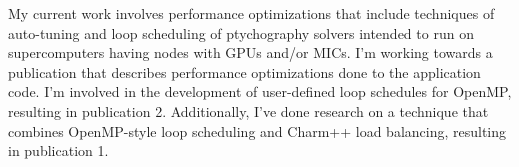 
My current work involves performance optimizations that include
techniques of auto-tuning and loop scheduling of ptychography solvers
intended to run on supercomputers having nodes with GPUs and/or MICs. 
I'm working towards a publication that describes performance
optimizations done to the application code.
I'm involved in the development of user-defined loop schedules
for OpenMP, resulting in publication 2. Additionally, I've done
research on a technique that combines OpenMP-style loop scheduling and
Charm++ load balancing, resulting in publication 1. 

